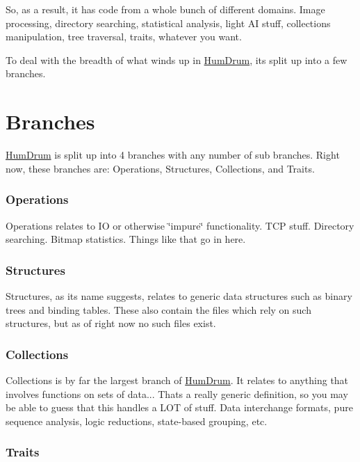 So, as a result, it has code from a whole bunch of different domains. Image processing, directory searching, statistical analysis, light AI stuff, collections manipulation, tree traversal, traits, whatever you want.

To deal with the breadth of what winds up in \hyperlink{namespaceHumDrum}{Hum\+Drum}, it\textquotesingle{}s split up into a few branches.

\section*{Branches}

\hyperlink{namespaceHumDrum}{Hum\+Drum} is split up into 4 branches with any number of sub branches. Right now, these branches are\+: Operations, Structures, Collections, and Traits.

\subsubsection*{Operations}

Operations relates to IO or otherwise \char`\"{}impure\char`\"{} functionality. T\+CP stuff. Directory searching. Bitmap statistics. Things like that go in here.

\subsubsection*{Structures}

Structures, as its name suggests, relates to generic data structures such as binary trees and binding tables. These also contain the files which rely on such structures, but as of right now no such files exist.

\subsubsection*{Collections}

Collections is by far the largest branch of \hyperlink{namespaceHumDrum}{Hum\+Drum}. It relates to anything that involves functions on sets of data... That\textquotesingle{}s a really generic definition, so you may be able to guess that this handles a L\+OT of stuff. Data interchange formats, pure sequence analysis, logic reductions, state-\/based grouping, etc.

\subsubsection*{Traits}

